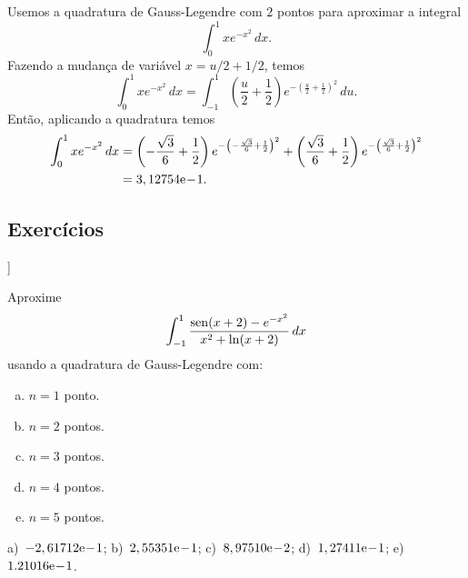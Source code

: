 \begin{ex}
Usemos a quadratura de Gauss-Legendre com $2$ pontos para aproximar a integral
\begin{equation}
  \int_0^{1} xe^{-x^2}\,dx.
\end{equation}
Fazendo a mudança de variável $x=u/2 + 1/2$, temos
\begin{equation}
  \int_0^{1} xe^{-x^2}\,dx = \int_{-1}^1 \left(\frac{u}{2}+\frac{1}{2}\right)e^{-\left(\frac{u}{2}+\frac{1}{2}\right)^2}\,du.
\end{equation}
Então, aplicando a quadratura temos
\begin{align}
  \int_0^{1} xe^{-x^2}\,dx &= \left(-\frac{\sqrt{3}}{6}+\frac{1}{2}\right)e^{-\left(-\frac{\sqrt{3}}{6}+\frac{1}{2}\right)^2} + \left(\frac{\sqrt{3}}{6}+\frac{1}{2}\right)e^{-\left(\frac{\sqrt{3}}{6}+\frac{1}{2}\right)^2} \\
  &= 3,12754\mathrm{e}\!-\!1.
\end{align}

\end{ex}

\subsection*{Exercícios}

\begin{flushleft}
  [[tag:revisar]]
\end{flushleft}

\begin{exer}\label{exer:GL_fun}
  Aproxime
  \begin{equation}
    \int_{-1}^1 \frac{\operatorname{sen}(x+2)-e^{-x^2}}{x^2+\ln(x+2)}\,dx
  \end{equation}
usando a quadratura de Gauss-Legendre com:
\begin{enumerate}[a)]
\item $n=1$ ponto.
\item $n=2$ pontos.
\item $n=3$ pontos.
\item $n=4$ pontos.
\item $n=5$ pontos.
\end{enumerate}
\end{exer}
\begin{resp}
  a)~$-2,61712\mathrm{e}\!-\!1$; b)~$2,55351\mathrm{e}\!-\!1$; c)~$8,97510\mathrm{e}\!-\!2$; d)~$1,27411\mathrm{e}\!-\!1$; e)~$1.21016\mathrm{e}\!-\!1$.
\end{resp}

